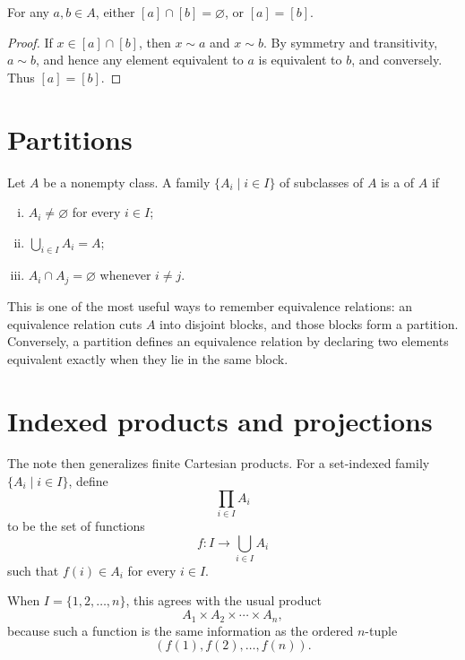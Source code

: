 \begin{lemma}
For any \(a,b\in A\), either \([a]\cap[b]=\varnothing\), or \([a]=[b]\).
\end{lemma}

\begin{proof}
If \(x\in [a]\cap[b]\), then \(x\sim a\) and \(x\sim b\).  By symmetry and transitivity, \(a\sim b\), and hence any element equivalent to \(a\) is equivalent to \(b\), and conversely.  Thus \([a]=[b]\).
\end{proof}

\section{Partitions}

\begin{definition}
Let \(A\) be a nonempty class.  A family \(\{A_i\mid i\in I\}\) of subclasses of \(A\) is a  of \(A\) if
\begin{enumerate}[(i)]
  \item \(A_i\neq\varnothing\) for every \(i\in I\);
  \item \(\bigcup_{i\in I} A_i=A\);
  \item \(A_i\cap A_j=\varnothing\) whenever \(i\neq j\).
\end{enumerate}
\end{definition}

\begin{remark}
This is one of the most useful ways to remember equivalence relations: an equivalence relation cuts \(A\) into disjoint blocks, and those blocks form a partition.  Conversely, a partition defines an equivalence relation by declaring two elements equivalent exactly when they lie in the same block.
\end{remark}

\section{Indexed products and projections}

The note then generalizes finite Cartesian products.  For a set-indexed family \(\{A_i\mid i\in I\}\), define
\[
  \prod_{i\in I}A_i
\]
to be the set of functions
\[
  f:I\to \bigcup_{i\in I}A_i
\]
such that \(f(i)\in A_i\) for every \(i\in I\).

When \(I=\{1,2,\dots,n\}\), this agrees with the usual product
\[
  A_1\times A_2\times\cdots\times A_n,
\]
because such a function is the same information as the ordered \(n\)-tuple
\[
  (f(1),f(2),\dots,f(n)).
\]

